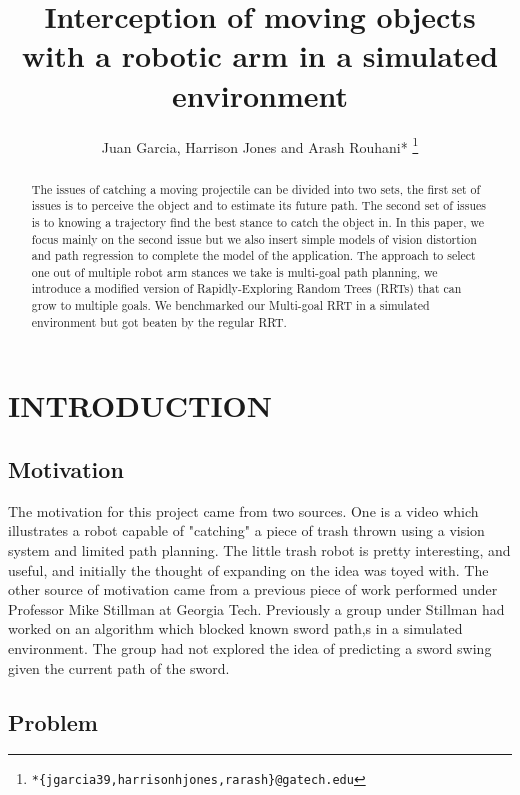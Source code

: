 \documentclass[letterpaper, 10 pt, conference]{ieeeconf}  %
\title{\LARGE \bf
Interception of moving objects with a robotic arm in a simulated environment
}
\author{Juan Garcia, Harrison Jones and Arash Rouhani*
  \thanks{\texttt{*\{jgarcia39,harrisonhjones,rarash\}@gatech.edu}}
}
\begin{document}
\maketitle
\thispagestyle{empty}
\pagestyle{empty}


\begin{abstract}

The issues of catching a moving projectile can be divided into two sets,
the first set of issues is to perceive the object and to estimate its
future path.  The second set of issues is to knowing a trajectory find
the best stance to catch the object in. In this paper, we focus mainly
on the second issue but we also insert simple models of vision
distortion and path regression to complete the model of the application.
The approach to select one out of multiple robot arm stances we take is
multi-goal path planning, we introduce a modified version of
Rapidly-Exploring Random Trees (RRTs) that can grow to multiple goals.
We benchmarked our Multi-goal RRT in a simulated environment but got
beaten by the regular RRT.

\end{abstract}


\section{INTRODUCTION}

\subsection{Motivation}

The motivation for this project came from two sources. One is a video which
illustrates a robot capable of "catching" a piece of trash thrown using a
vision system and limited path planning. The little trash robot is pretty
interesting, and useful, and initially the thought of expanding on the idea was
toyed with. The other source of motivation came from a previous piece of work
performed under Professor Mike Stillman at Georgia Tech. Previously a group
under Stillman had worked on an algorithm which blocked known sword path,s in a
simulated environment. The group had not explored the idea of predicting a
sword swing given the current path of the sword.

\subsection{Problem}
\end{document}
